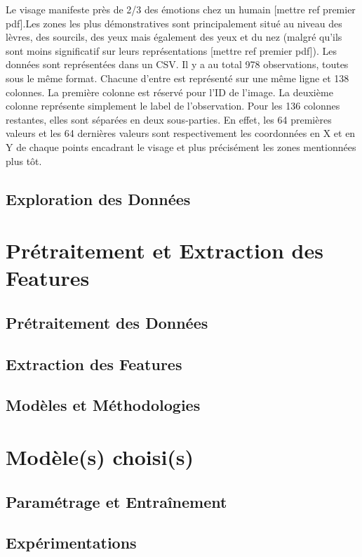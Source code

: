 \documentclass{rapport}
\begin{document}
Le visage manifeste près de 2/3 des émotions chez un humain 
[mettre ref premier pdf].Les zones les plus démonstratives sont 
principalement situé au niveau des lèvres, des sourcils, des yeux mais 
également des yeux et du nez (malgré qu'ils sont moins significatif sur leurs
représentations [mettre ref premier pdf]). Les données sont représentées dans 
un CSV. Il y a au total 978 observations, toutes sous le même format. Chacune 
d'entre est représenté sur une même ligne et 138 colonnes. La première colonne 
est réservé pour l'ID de l'image. La deuxième colonne représente simplement le 
label de l'observation. Pour les 136 colonnes restantes, elles sont séparées 
en deux sous-parties. En effet, les 64 premières valeurs et les 64 dernières 
valeurs sont respectivement les coordonnées en X et en Y de chaque points 
encadrant le visage et plus précisément les zones mentionnées plus tôt.

\subsection{Exploration des Données}

\section{Prétraitement et Extraction des Features}
\subsection{Prétraitement des Données}
\subsection{Extraction des Features}
\subsection{Modèles et Méthodologies}

\section{Modèle(s) choisi(s)}
\subsection{Paramétrage et Entraînement}
\subsection{Expérimentations}
\end{document}
